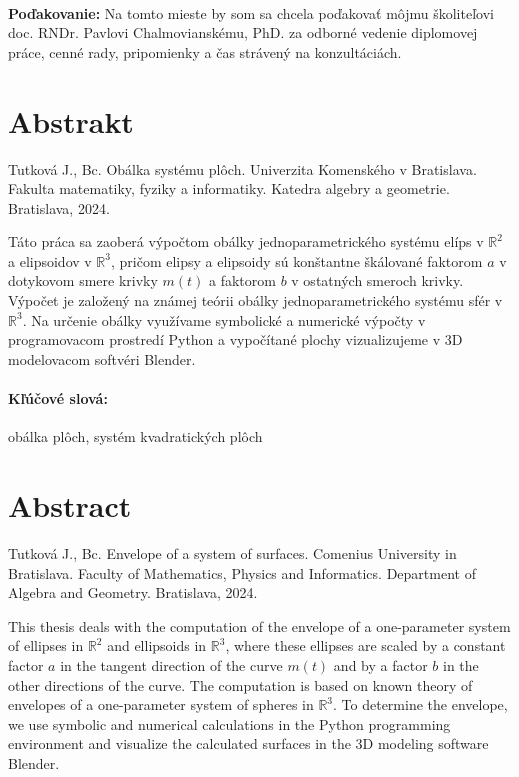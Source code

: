 \documentclass[12pt, twoside]{book}
\theoremstyle{definition}
\begin{document}

\frontmatter

\setcounter{page}{3}
\newpage 
~

\vfill
{\bf Poďakovanie:} Na tomto mieste by som sa chcela poďakovať môjmu školiteľovi
doc. RNDr. Pavlovi Chalmovianskému, PhD. za odborné vedenie diplomovej práce, cenné rady, pripomienky a čas strávený na konzultáciách.


\newpage 
\section*{Abstrakt}
Tutková J., Bc. Obálka systému plôch. Univerzita Komenského v Bratislava. Fakulta matematiky, fyziky a informatiky. Katedra algebry a geometrie. Bratislava, 2024.
\vspace{\baselineskip}

\noindent Táto práca sa zaoberá výpočtom obálky jednoparametrického systému elíps v $\mathbb{R}^2$ a elipsoidov v $\mathbb{R}^3$, pričom elipsy a elipsoidy sú konštantne škálované faktorom $a$ v dotykovom smere krivky $m(t)$ a faktorom $b$ v ostatných smeroch krivky. Výpočet je založený na známej teórii obálky jednoparametrického systému sfér v $\mathbb{R}^3.$ Na určenie obálky využívame symbolické a numerické výpočty v programovacom prostredí Python a vypočítané plochy vizualizujeme v 3D modelovacom softvéri Blender. 

\paragraph*{Kľúčové slová:} obálka plôch, systém kvadratických plôch


\newpage
\section*{Abstract} 
Tutková J., Bc. Envelope of a system of surfaces. Comenius University in Bratislava. Faculty of Mathematics, Physics and Informatics. Department of Algebra and Geometry. Bratislava, 2024.
\vspace{\baselineskip}

\noindent This thesis deals with the computation of the envelope of a one-parameter system of ellipses in $\mathbb{R}^2$ and ellipsoids in $\mathbb{R}^3$, where these ellipses are scaled by a constant factor $a$ in the tangent direction of the curve $m(t)$ and by a factor $b$ in the other directions of the curve. The computation is based on known  theory of envelopes of a one-parameter system of spheres in $\mathbb{R}^3$. To determine the envelope, we use symbolic and numerical calculations in the Python programming environment and visualize the calculated surfaces in the 3D modeling software Blender.
\end{document}
